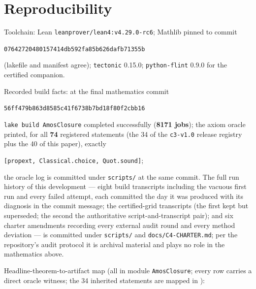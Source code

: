 \documentclass[11pt]{article}
\newcommand{\lean}[1]{\texttt{#1}}
\begin{document}
\section{Reproducibility}\label{sec:repro}

Toolchain: Lean \lean{leanprover/lean4:v4.29.0-rc6}; Mathlib pinned
to commit
\begin{center}\small
\lean{07642720480157414db592fa85b626dafb71355b}
\end{center}
\noindent (lakefile and manifest agree); \lean{tectonic} 0.15.0;
\lean{python-flint} 0.9.0 for the certified companion.

\medskip
\noindent Recorded build facts: at the final mathematics commit
\begin{center}\small
\lean{56ff479b863d8585c41f6738b7bd18f80f2cbb16}
\end{center}
\noindent \lean{lake build AmosClosure} completed successfully
(\textbf{8171 jobs}); the axiom oracle printed, for all \textbf{74}
registered statements (the 34 of the \lean{c3-v1.0} release
registry plus the 40 of this paper), exactly
\begin{center}
\lean{[propext, Classical.choice, Quot.sound]};
\end{center}
\noindent the oracle log is committed under \lean{scripts/} at the
same commit.  The full run history of this development --- eight
build transcripts including the vacuous first run and every failed
attempt, each committed the day it was produced with its diagnosis
in the commit message; the certified-grid transcripts (the
first kept but superseded; the second the authoritative
script-and-transcript pair); and six
charter amendments recording every external audit round and every
method deviation --- is committed under \lean{scripts/} and
\lean{docs/C4-CHARTER.md}; per the repository's audit protocol it is
archival material and plays no role in the mathematics above.

\medskip
\noindent Headline-theorem-to-artifact map (all in module
\lean{AmosClosure}; every row carries a direct oracle witness; the
34 inherited statements are mapped in \cite{ErikssonC2,ErikssonC3}):
\end{document}
